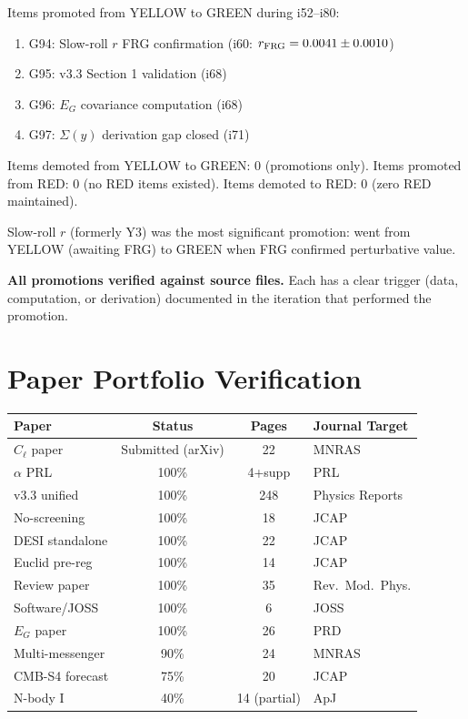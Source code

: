 \documentclass[11pt,a4paper]{article}
\begin{document}
Items promoted from YELLOW to GREEN during i52--i80:
\begin{enumerate}[nosep]
\item G94: Slow-roll $r$ FRG confirmation (i60: $r_{\rm FRG} = 0.0041 \pm 0.0010$)
\item G95: v3.3 Section 1 validation (i68)
\item G96: $E_G$ covariance computation (i68)
\item G97: $\Sigma(y)$ derivation gap closed (i71)
\end{enumerate}

Items demoted from YELLOW to GREEN: 0 (promotions only).
Items promoted from RED: 0 (no RED items existed).
Items demoted to RED: 0 (zero RED maintained).

Slow-roll $r$ (formerly Y3) was the most significant promotion: went from YELLOW (awaiting FRG) to GREEN when FRG confirmed perturbative value.

\textbf{All promotions verified against source files.} Each has a clear trigger (data, computation, or derivation) documented in the iteration that performed the promotion.

\section{Paper Portfolio Verification}

\begin{center}
\begin{tabular}{lccl}
\toprule
\textbf{Paper} & \textbf{Status} & \textbf{Pages} & \textbf{Journal Target} \\
\midrule
$C_\ell$ paper & Submitted (arXiv) & 22 & MNRAS \\
$\alpha$ PRL & 100\% & 4+supp & PRL \\
v3.3 unified & 100\% & 248 & Physics Reports \\
No-screening & 100\% & 18 & JCAP \\
DESI standalone & 100\% & 22 & JCAP \\
Euclid pre-reg & 100\% & 14 & JCAP \\
Review paper & 100\% & 35 & Rev.\ Mod.\ Phys. \\
Software/JOSS & 100\% & 6 & JOSS \\
$E_G$ paper & 100\% & 26 & PRD \\
\midrule
Multi-messenger & 90\% & 24 & MNRAS \\
CMB-S4 forecast & 75\% & 20 & JCAP \\
N-body I & 40\% & 14 (partial) & ApJ \\
\bottomrule
\end{tabular}
\end{center}
\end{document}
